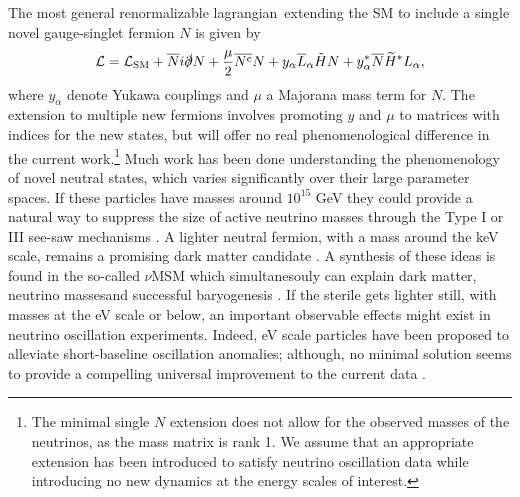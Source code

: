 \documentclass[11pt, a4paper]{article}
\def\lagrangian{lagrangian}
\begin{document}
The most general renormalizable \lagrangian\ extending the SM to include a
single novel gauge-singlet fermion $N$ is given by
%
\begin{align}   \mathcal{L} = \mathcal{L}_\text{SM} +
\overline{N}i\slashed{\partial}N+ \frac{\mu}{2} \overline{N^\text{c}}N  +
y_\alpha\overline{L}_\alpha\tilde{H} N + y_\alpha^*
\overline{N}\widetilde{H}^*L_\alpha,\label{eq:minimallag} \end{align}
%
where $y_\alpha$ denote Yukawa couplings and $\mu$ a Majorana mass term for
$N$. The extension to multiple new fermions involves promoting $y$ and $\mu$ to
matrices with indices for the new states, but will offer no real
phenomenological difference in the current work.\footnote{The minimal single
$N$ extension does not allow for the observed masses of the neutrinos, as the
mass matrix is rank 1. We assume that an appropriate extension has been
introduced to satisfy neutrino oscillation data while introducing no new
dynamics at the energy scales of interest.} Much work has been done
understanding the phenomenology of novel neutral states, which varies
significantly over their large parameter spaces. 
%
If these particles have masses around $10^{15}$ GeV they could provide a
natural way to suppress the size of active neutrino masses through the Type I
or III see-saw mechanisms \cite{Minkowski:1977sc, GellMann:1980vs,
Mohapatra:1979ia}. A lighter neutral fermion, with a mass around the keV scale,
remains a promising dark matter candidate \cite{Adhikari:2016bei}. A synthesis
of these ideas is found in the so-called $\nu$MSM which simultanesouly can
explain dark matter, neutrino massesand successful baryogenesis
\cite{Asaka:2005pn}. 
%
If the sterile gets lighter still, with masses at the eV scale or below, an
important observable effects might exist in neutrino oscillation experiments.
Indeed, eV scale particles have been proposed to alleviate short-baseline
oscillation anomalies; although, no minimal solution seems to provide a
compelling universal improvement to the current data \cite{Kopp:2013vaa}. 
%
\end{document}
